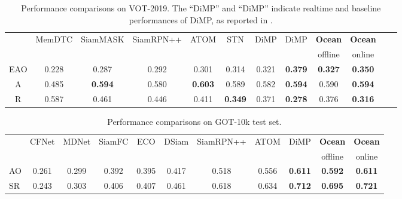 \documentclass[runningheads]{llncs}
\begin{document}
\setlength{\tabcolsep}{.2em}
\begin{table}[!t] \scriptsize
	\centering
\begin{tabular}{c| c  c c c c c c cc c c}
		& MemDTC  & SiamMASK  & SiamRPN++ & ATOM  & STN & DiMP & DiMP& \textbf{Ocean} & \textbf{Ocean}\\ &\cite{MemDTC}  & \cite{SiamMASK} & \cite{SiamRPN++} & \cite{ATOM} & \cite{STN} & \cite{DiMP} & \cite{DiMP} & offline & online\\
		
		\shline EAO   &0.228   & 0.287 & 0.292 & 0.301 & 0.314 &0.321 &\color{red}\textbf{0.379} & \color{blue}\textbf{0.327} & \color{green}\textbf{0.350} \\ A  &0.485    & \color{green}\textbf{0.594} & 0.580 & \color{red}\textbf{0.603} & 0.589 & 0.582& \color{green}\textbf{0.594}& 0.590 & \color{green}\textbf{0.594}\\ 

		R   &0.587 & 0.461 & 0.446 & 0.411  & \color{blue}\textbf{0.349}  & 0.371& \color{red}\textbf{0.278}&0.376 & \color{green}\textbf{0.316}\\ 

		
		
		
	\end{tabular}
	
	\caption{Performance comparisons on VOT-2019. The ``DiMP'' and ``DiMP'' indicate realtime and baseline performances of DiMP, as reported in \cite{VOT2019}.}
	\vspace{-2em}
	\label{VOT19TAB}
\end{table}


\setlength{\tabcolsep}{.25em}
\begin{table}[!t] \scriptsize
	\centering
\begin{tabular}{l| c  c c cc c c c c c}
		& CFNet & MDNet &SiamFC &ECO& DSiam& SiamRPN++ & ATOM & DiMP &  \textbf{Ocean} & \textbf{Ocean}\\ & \cite{CFNet} & \cite{MDNet} & \cite{siamFC}& \cite{ECO} & \cite{DSiam}& \cite{SiamRPN++} & \cite{ATOM} & \cite{DiMP} & offline & online \\
		
		\shline AO     & 0.261 & 0.299 & 0.392 & 0.395&  0.417 &0.518 & 0.556 & \color{red}\textbf{0.611} & \color{green}\textbf{0.592} & \color{red}\textbf{0.611} \\ SR     &0.243 & 0.303 & 0.406&0.407&0.461 & 0.618 & 0.634 & \color{green}\textbf{0.712}  & \color{blue}\textbf{0.695} & \color{red}\textbf{0.721}\\ 

		
		
	\end{tabular}
	
\caption{Performance comparisons on GOT-10k test set.}\vspace{-3.5em}
	\label{GOT10KTAB}
\end{table}
\end{document}
